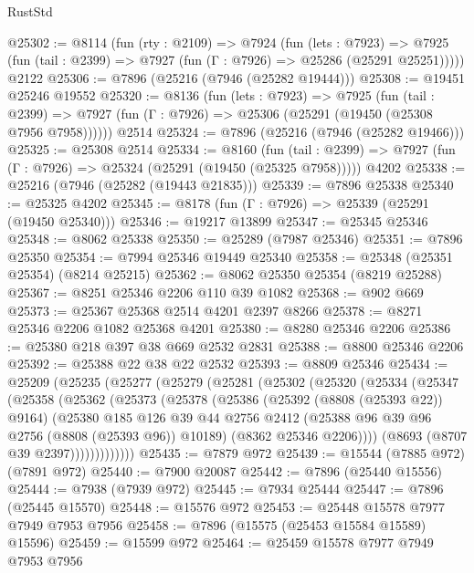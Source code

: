\begin{lexlean}{RustStd}
\begin{coremodule}
@25302 := @8114
    (fun (rty : @2109) =>
    @7924
      (fun (lets : @7923) =>
      @7925 (fun (tail : @2399) => @7927 (fun (Γ : @7926) => @25286 (@25291 @25251)))))
    @2122
@25306 := @7896 (@25216 (@7946 (@25282 @19444)))
@25308 := @19451 @25246 @19552
@25320 := @8136
    (fun (lets : @7923) =>
    @7925
      (fun (tail : @2399) =>
      @7927 (fun (Γ : @7926) => @25306 (@25291 (@19450 (@25308 @7956 @7958))))))
    @2514
@25324 := @7896 (@25216 (@7946 (@25282 @19466)))
@25325 := @25308 @2514
@25334 := @8160
    (fun (tail : @2399) => @7927 (fun (Γ : @7926) => @25324 (@25291 (@19450 (@25325 @7958)))))
    @4202
@25338 := @25216 (@7946 (@25282 (@19443 @21835)))
@25339 := @7896 @25338
@25340 := @25325 @4202
@25345 := @8178 (fun (Γ : @7926) => @25339 (@25291 (@19450 @25340)))
@25346 := @19217 @13899
@25347 := @25345 @25346
@25348 := @8062 @25338
@25350 := @25289 (@7987 @25346)
@25351 := @7896 @25350
@25354 := @7994 @25346 @19449 @25340
@25358 := @25348 (@25351 @25354) (@8214 @25215)
@25362 := @8062 @25350 @25354 (@8219 @25288)
@25367 := @8251 @25346 @2206 @110 @39 @1082
@25368 := @902 @669
@25373 := @25367 @25368 @2514 @4201 @2397 @8266
@25378 := @8271 @25346 @2206 @1082 @25368 @4201
@25380 := @8280 @25346 @2206
@25386 := @25380 @218 @397 @38 @669 @2532 @2831
@25388 := @8800 @25346 @2206
@25392 := @25388 @22 @38 @22 @2532
@25393 := @8809 @25346
@25434 := @25209
    (@25235
      (@25277
        (@25279
          (@25281
            (@25302
              (@25320
                (@25334
                  (@25347
                    (@25358
                      (@25362
                        (@25373
                          (@25378
                            (@25386
                              (@25392 (@8808 (@25393 @22)) @9164)
                              (@25380
                                @185
                                @126
                                @39
                                @44
                                @2756
                                @2412
                                (@25388 @96 @39 @96 @2756 (@8808 (@25393 @96)) @10189)
                                (@8362 @25346 @2206))))
                          (@8693 (@8707 @39 @2397)))))))))))))
@25435 := @7879 @972
@25439 := @15544 (@7885 @972) (@7891 @972)
@25440 := @7900 @20087
@25442 := @7896 (@25440 @15556)
@25444 := @7938 (@7939 @972)
@25445 := @7934 @25444
@25447 := @7896 (@25445 @15570)
@25448 := @15576 @972
@25453 := @25448 @15578 @7977 @7949 @7953 @7956
@25458 := @7896 (@15575 (@25453 @15584 @15589) @15596)
@25459 := @15599 @972
@25464 := @25459 @15578 @7977 @7949 @7953 @7956

\end{coremodule}
\end{lexlean}
